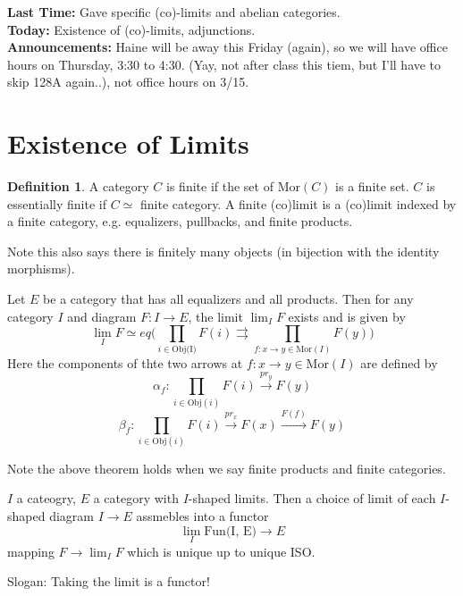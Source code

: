 \documentclass{article}
\theoremstyle{definition}
\theoremstyle{definition}
\newtheorem{definition}{Definition}[section]
\theoremstyle{remark}
\begin{document}
\textbf{Last Time: } Gave specific (co)-limits and abelian categories.\\

\textbf{Today: } Existence of (co)-limits, adjunctions.\\

\textbf{Announcements: } Haine will be away this Friday (again), so we will have office hours on Thursday, 3:30 to 4:30. (Yay, not after class this tiem, but I'll have to skip 128A again..), not office hours on 3/15.\\

\section{Existence of Limits}

\begin{definition}
	A category $C$ is finite if the set of $\text{Mor}(C)$ is a finite set. $C$ is essentially finite if $C \simeq$ finite category. A finite (co)limit is a (co)limit indexed by a finite category, e.g. equalizers, pullbacks, and finite products.
\end{definition}

Note this also says there is finitely many objects  (in bijection with the identity morphisms).

\begin{theo}{}{}
	Let $E$ be a category that has all equalizers and all products. 
	Then for any category $I$ and diagram $F: I \to E$, the limit $\lim_I F$ exists and is given by 
	\[\lim_I F \simeq eq \Big( \prod_{i \in \text{Obj(I)}}F(i) \rightrightarrows \prod_{f:x \to y \in \text{Mor}(I)}F(y)\Big)\]
	Here the components of thte two arrows at $f:x \to y \in \text{Mor}(I)$ are defined by 
	\[\alpha_f: \prod_{i \in \text{Obj}(i)}F(i) \xrightarrow{pr_y}F(y)\]
	\[\beta_f: \prod_{i \in \text{Obj}(i)}F(i) \xrightarrow{pr_x}F(x) \xrightarrow{F(f)} F(y)\]

\end{theo}

Note the above theorem holds when we say finite products and finite categories.

\begin{lemm}{}{}
	$I$ a cateogry, $E$ a category with $I$-shaped limits. 
	Then a choice of limit of each $I$-shaped diagram $I \to E$ assmebles into a functor
	\[\lim_I \text{Fun(I, E)} \to E\]
mapping $F \to \lim_I F$ which is unique up to unique ISO.
\end{lemm}
Slogan: Taking the limit is a functor!
\end{document}
